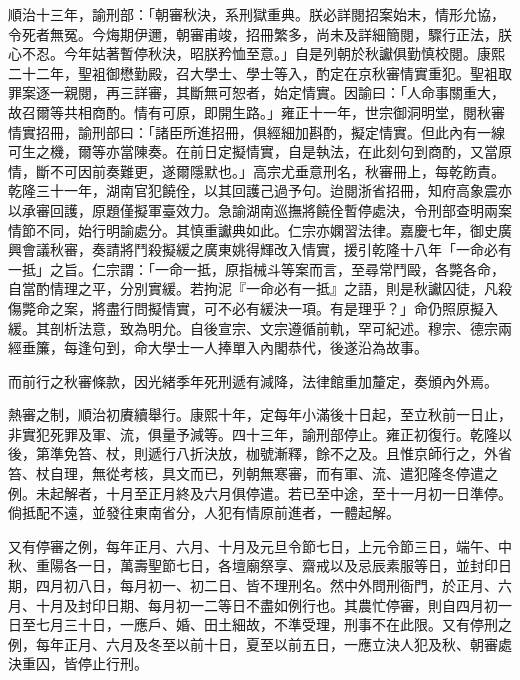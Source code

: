 \begin{pinyinscope}
順治十三年，諭刑部：「朝審秋決，系刑獄重典。朕必詳閱招案始末，情形允協，令死者無冤。今烸期伊邇，朝審甫竣，招冊繁多，尚未及詳細簡閱，驟行正法，朕心不忍。今年姑著暫停秋決，昭朕矜恤至意。」自是列朝於秋讞俱勤慎校閱。康熙二十二年，聖袓御懋勤殿，召大學士、學士等入，酌定在京秋審情實重犯。聖袓取罪案逐一親閱，再三詳審，其斷無可恕者，始定情實。因諭曰：「人命事關重大，故召爾等共相商酌。情有可原，即開生路。」雍正十一年，世宗御洞明堂，閱秋審情實招冊，諭刑部曰：「諸臣所進招冊，俱經細加斟酌，擬定情實。但此內有一線可生之機，爾等亦當陳奏。在前日定擬情實，自是執法，在此刻句到商酌，又當原情，斷不可因前奏難更，遂爾隱默也。」高宗尤垂意刑名，秋審冊上，每乾飭責。乾隆三十一年，湖南官犯饒佺，以其回護己過予句。迨閱浙省招冊，知府高象震亦以承審回護，原題僅擬軍臺效力。急諭湖南巡撫將饒佺暫停處決，令刑部查明兩案情節不同，始行明諭處分。其慎重讞典如此。仁宗亦嫻習法律。嘉慶七年，御史廣興會議秋審，奏請將鬥殺擬緩之廣東姚得輝改入情實，援引乾隆十八年「一命必有一抵」之旨。仁宗謂：「一命一抵，原指械斗等案而言，至尋常鬥毆，各斃各命，自當酌情理之平，分別實緩。若拘泥『一命必有一抵』之語，則是秋讞囚徒，凡殺傷斃命之案，將盡行問擬情實，可不必有緩決一項。有是理乎？」命仍照原擬入緩。其剖析法意，致為明允。自後宣宗、文宗遵循前軌，罕可紀述。穆宗、德宗兩經垂簾，每逢句到，命大學士一人捧單入內閣恭代，後遂沿為故事。

而前行之秋審條款，因光緒季年死刑遞有減降，法律館重加釐定，奏頒內外焉。

熱審之制，順治初賡續舉行。康熙十年，定每年小滿後十日起，至立秋前一日止，非實犯死罪及軍、流，俱量予減等。四十三年，諭刑部停止。雍正初復行。乾隆以後，第準免笞、杖，則遞行八折決放，枷號漸釋，餘不之及。且惟京師行之，外省笞、杖自理，無從考核，具文而已，列朝無寒審，而有軍、流、遣犯隆冬停遣之例。未起解者，十月至正月終及六月俱停遣。若已至中途，至十一月初一日準停。倘抵配不遠，並發往東南省分，人犯有情原前進者，一體起解。

又有停審之例，每年正月、六月、十月及元旦令節七日，上元令節三日，端午、中秋、重陽各一日，萬壽聖節七日，各壇廟祭享、齋戒以及忌辰素服等日，並封印日期，四月初八日，每月初一、初二日、皆不理刑名。然中外問刑衙門，於正月、六月、十月及封印日期、每月初一二等日不盡如例行也。其農忙停審，則自四月初一日至七月三十日，一應戶、婚、田土細故，不準受理，刑事不在此限。又有停刑之例，每年正月、六月及冬至以前十日，夏至以前五日，一應立決人犯及秋、朝審處決重囚，皆停止行刑。


\end{pinyinscope}
